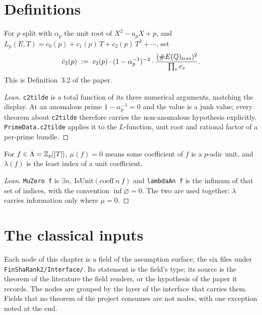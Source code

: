 \chapter{Definitions}
\label{ch:definitions}

\begin{definition}
  \label{def:NormalisedSecondJet}
  \leanok
  For $p$ split with $\alpha_p$ the unit root of $X^2 - a_pX + p$, and
  $L_p(E,T) = c_0(p) + c_1(p)\,T + c_2(p)\,T^2 + \cdots$, set
  \[
     \tilde c_2(p) \;:=\; c_2(p) \cdot (1 - \alpha_p^{-1})^{-2} \cdot
     \frac{(\#E(\mathbb{Q})_{\mathrm{tors}})^2}{\prod_v c_v} .
  \]
  This is Definition~3.2 of the paper.
\end{definition}
\begin{proof}[Lean]
  \leanok
  \texttt{c2tilde} is a total function of its three numerical arguments,
  matching the display. At an anomalous prime $1 - \alpha_p^{-1} = 0$ and the
  value is a junk value; every theorem about \texttt{c2tilde} therefore
  carries the non-anomalous hypothesis explicitly.
  \texttt{PrimeData.c2tilde} applies it to the $L$-function, unit root and
  rational factor of a per-prime bundle.
\end{proof}

\begin{definition}
  \label{def:IwasawaInvariants}
  \leanok
  For $f \in \Lambda = \mathbb{Z}_p[[T]]$, $\mu(f) = 0$ means some coefficient of
  $f$ is a $p$-adic unit, and $\lambda(f)$ is the least index of a unit
  coefficient.
\end{definition}
\begin{proof}[Lean]
  \leanok
  \texttt{MuZero f} is $\exists n,\ \mathrm{IsUnit}(\mathrm{coeff}\ n\ f)$
  and \texttt{lambdaAn f} is the infimum of that set of indices, with the
  convention $\inf \varnothing = 0$. The two are used together: $\lambda$
  carries information only where $\mu = 0$.
\end{proof}

\chapter{The classical inputs}
\label{ch:inputs}

Each node of this chapter is a field of the assumption surface, the six
files under \texttt{FinShaRank2/Interface/}. Its statement is the field's
type; its source is the theorem of the literature the field renders, or the
hypothesis of the paper it records. The nodes are grouped by the layer of
the interface that carries them. Fields that no theorem of the project
consumes are not nodes, with one exception noted at the end.

